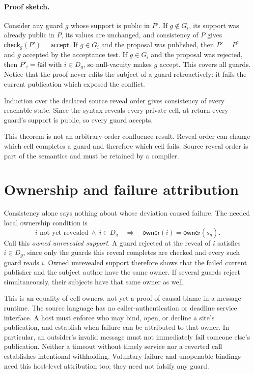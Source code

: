 \documentclass[11pt]{article}
\newcommand{\Failed}{\mathsf{fail}}
\newcommand{\Sat}{\mathsf{accept}}
\newcommand{\owner}{\mathsf{owner}}
\begin{document}
\paragraph{Proof sketch.}
Consider any guard $g$ whose support is public in $P'$.  If $g\notin G_i$, its
support was already public in $P$, its values are unchanged, and consistency of
$P$ gives $\mathsf{check}_g(P')=\Sat$.  If $g\in G_i$ and the proposal was
published, then $P'=P^c$ and $g$ accepted by the acceptance test.  If $g\in
G_i$ and the proposal was rejected, then $P'_i=\Failed$ with $i\in D_g$, so
null-vacuity makes $g$ accept.  This covers all guards.  Notice that the proof
never edits the subject of a guard retroactively: it fails the current
publication which exposed the conflict.

Induction over the declared source reveal order gives consistency of every
reachable state.  Since the syntax reveals every private cell, at return every
guard's support is public, so every guard accepts.

This theorem is not an arbitrary-order confluence result.  Reveal order can
change which cell completes a guard and therefore which cell fails.  Source
reveal order is part of the semantics and must be retained by a compiler.

\section{Ownership and failure attribution}

Consistency alone says nothing about whose deviation caused failure.  The
needed local ownership condition is
\[
  \text{$i$ not yet revealed}\ \wedge\ i\in D_g
  \quad\Longrightarrow\quad
  \owner(i)=\owner(s_g).
\]
Call this \emph{owned unrevealed support}.  A guard rejected at the reveal of
$i$ satisfies $i\in D_g$, since only the guards this reveal completes are
checked and every such guard reads $i$.  Owned unrevealed support therefore
shows that the failed current publisher and the subject author have the same
owner.  If several guards reject simultaneously, their subjects have that same
owner as well.

This is an equality of cell owners, not yet a proof of causal blame in a
message runtime. The source language has no caller-authentication or deadline
service interface. A host must enforce who may bind, open, or decline a site's
publication, and establish when failure can be attributed to that owner.
In particular, an outsider's invalid message must not immediately fail someone
else's publication. Neither a timeout without timely service nor a reverted
call establishes intentional withholding. Voluntary failure and unopenable
bindings need this host-level attribution too; they need not falsify any guard.
\end{document}
